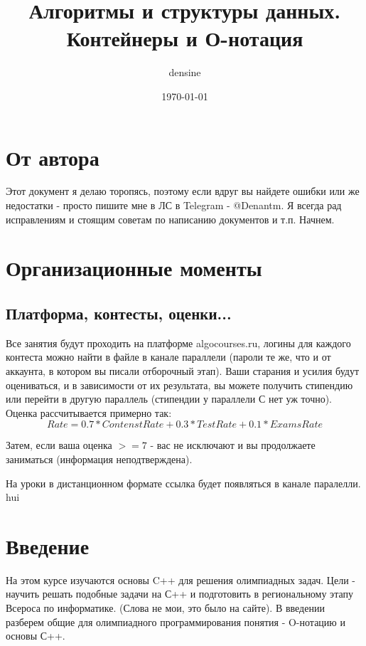 \documentclass[a4paper,12pt]{article}
\title{Алгоритмы и структуры данных. Контейнеры и О-нотация}
\author{densine}
\date{\today}
\begin{document}
\maketitle
\tableofcontents

\section{От автора}
Этот документ я делаю торопясь, поэтому если вдруг вы найдете ошибки или же недостатки -
просто пишите мне в ЛС в Telegram - @Denantm. Я всегда рад исправлениям и стоящим
советам по написанию документов и т.п. Начнем.

\section{Организационные моменты}

\subsection{Платформа, контесты, оценки...}
Все занятия будут проходить на платформе algocourses.ru, логины для каждого контеста можно
найти в файле в канале параллели (пароли те же, что и от аккаунта, в котором вы писали
отборочный этап).
Ваши старания и усилия будут оцениваться, и в зависимости от их результата, вы можете получить
стипендию или перейти в другую параллель (стипендии у параллели С нет уж точно).
Оценка рассчитывается примерно так:
\[
	Rate = 0.7 * ContenstRate + 0.3 * TestRate + 0.1 * ExamsRate
\]

Затем, если ваша оценка  $>=7$ - вас не исключают и вы продолжаете заниматься (информация
неподтверждена).

На уроки в дистанционном формате ссылка будет появляться в канале паралелли.
hui

\section{Введение}
На этом курсе изучаются основы C++ для решения олимпиадных задач. Цели - научить
решать подобные задачи на С++ и подготовить в региональному этапу Всероса по информатике.
(Слова не мои, это было на сайте). В введении разберем общие для олимпиадного
программирования понятия - O-нотацию и основы С++.
\end{document}
